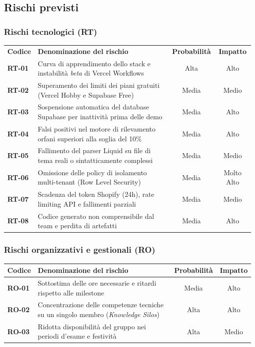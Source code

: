 \subsection{Rischi previsti}

\subsubsection{Rischi tecnologici (RT)}
\noindent
\begin{tabularx}{\textwidth}{|l X c c|}
\hline
\textbf{Codice} & \textbf{Denominazione del rischio} & \textbf{Probabilità} & \textbf{Impatto} \\
\textbf{RT-01} & Curva di apprendimento dello stack e instabilità \textit{beta} di Vercel Workflows & Alta & Alto \\
\hline
\textbf{RT-02} & Superamento dei limiti dei piani gratuiti (Vercel Hobby e Supabase Free) & Media & Medio  \\
\hline
\textbf{RT-03} & Sospensione automatica del database Supabase per inattività prima delle demo & Media & Alto  \\
\hline
\textbf{RT-04} & Falsi positivi nel motore di rilevamento orfani superiori alla soglia del 10\% & Media & Alto  \\
\hline
\textbf{RT-05} & Fallimento del parser Liquid su file di tema reali o sintatticamente complessi & Media & Medio  \\
\hline
\textbf{RT-06} & Omissione delle policy di isolamento multi-tenant (Row Level Security) & Media & Molto Alto  \\
\hline
\textbf{RT-07} & Scadenza del token Shopify (24h), rate limiting API e fallimenti parziali & Media & Medio  \\
\hline
\textbf{RT-08} & Codice generato non comprensibile dal team e perdita di artefatti & Media & Alto \\
\hline
\end{tabularx}

\subsubsection{Rischi organizzativi e gestionali (RO)}
\vspace{2mm}
\noindent
\begin{tabularx}{\textwidth}{|l X c c|}
\hline
\textbf{Codice} & \textbf{Denominazione del rischio} & \textbf{Probabilità} & \textbf{Impatto} \\
\hline
\textbf{RO-01} & Sottostima delle ore necessarie e ritardi rispetto alle milestone & Media & Alto \\
\hline
\textbf{RO-02} & Concentrazione delle competenze tecniche su un singolo membro (\textit{Knowledge Silos}) & Alta & Alto \\
\hline
\textbf{RO-03} & Ridotta disponibilità del gruppo nei periodi d'esame e festività & Alta & Medio \\
\hline
\end{tabularx}

